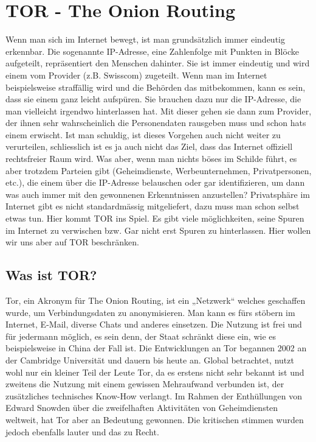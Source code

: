 \chapter{TOR - The Onion Routing}
Wenn man sich im Internet bewegt, ist man grundsätzlich immer eindeutig erkennbar. Die sogenannte IP-Adresse, eine Zahlenfolge mit Punkten in Blöcke aufgeteilt, repräsentiert den Menschen dahinter. Sie ist immer eindeutig und wird einem vom Provider (z.B. Swisscom) zugeteilt. Wenn man im Internet beispielsweise straffällig wird und die Behörden das mitbekommen, kann es sein, dass sie einem ganz leicht aufspüren. Sie brauchen dazu nur die IP-Adresse, die man vielleicht irgendwo hinterlassen hat. Mit dieser gehen sie dann zum Provider, der ihnen sehr wahrscheinlich die Personendaten rausgeben muss und schon hats einem erwischt. Ist man schuldig, ist dieses Vorgehen auch nicht weiter zu verurteilen, schliesslich ist es ja auch nicht das Ziel, dass das Internet offiziell rechtsfreier Raum wird. Was aber, wenn man nichts böses im Schilde führt, es aber trotzdem Parteien gibt (Geheimdienste, Werbeunternehmen, Privatpersonen, etc.), die einem über die IP-Adresse belauschen oder gar identifizieren, um dann was auch immer mit den gewonnenen Erkenntnissen anzustellen? Privatsphäre im Internet gibt es nicht standardmässig mitgeliefert, dazu muss man schon selbst etwas tun. Hier kommt TOR ins Spiel. Es gibt viele möglichkeiten, seine Spuren im Internet zu verwischen bzw. Gar nicht erst Spuren zu hinterlassen. Hier wollen wir uns aber auf TOR beschränken.

\section{Was ist TOR?}
Tor, ein Akronym für The Onion Routing, ist ein „Netzwerk“ welches geschaffen wurde, um Verbindungsdaten zu anonymisieren. Man kann es fürs stöbern im Internet, E-Mail, diverse Chats und anderes einsetzen. Die Nutzung ist frei und für jedermann möglich, es sein denn, der Staat schränkt diese ein, wie es beispielsweise in China der Fall ist. Die Entwicklungen an Tor begannen 2002 an der Cambridge Universität und dauern bis heute an. Global betrachtet, nutzt wohl nur ein kleiner Teil der Leute Tor, da es erstens nicht sehr bekannt ist und zweitens die Nutzung mit einem gewissen Mehraufwand verbunden ist, der zusätzliches technisches Know-How verlangt. Im Rahmen der Enthüllungen von Edward Snowden über die zweifelhaften Aktivitäten von Geheimdiensten weltweit, hat Tor aber an Bedeutung gewonnen. Die kritischen stimmen wurden jedoch ebenfalls lauter und das zu Recht.

